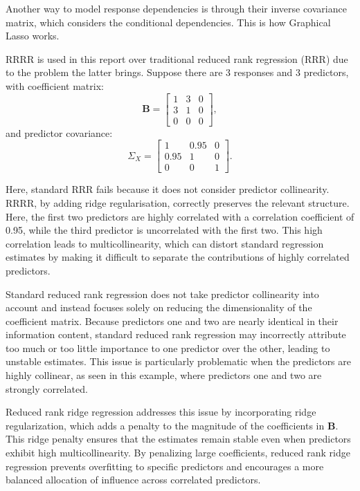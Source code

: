 Another way to model response dependencies is through their inverse covariance matrix, which considers the conditional dependencies. This is how Graphical Lasso works.



RRRR is used in this report over traditional reduced rank regression (RRR) due to the problem the latter brings. Suppose there are 3 responses and 3 predictors, with coefficient matrix:
\[
\mathbf{B} = \begin{bmatrix} 1 & 3 & 0 \\ 3 & 1 & 0 \\ 0 & 0 & 0 \end{bmatrix},
\]
and predictor covariance:
\[
{\Sigma}_X = \begin{bmatrix} 1 & 0.95 & 0 \\ 0.95 & 1 & 0 \\ 0 & 0 & 1 \end{bmatrix}.
\]

\noindent Here, standard RRR fails because it does not consider predictor collinearity. RRRR, by adding ridge regularisation, correctly preserves the relevant structure.\cite{mukherjee2011reduced} Here, the first two predictors are highly correlated with a correlation coefficient of 0.95, while the third predictor is uncorrelated with the first two. This high correlation leads to multicollinearity, which can distort standard regression estimates by making it difficult to separate the contributions of highly correlated predictors.  

Standard reduced rank regression does not take predictor collinearity into account and instead focuses solely on reducing the dimensionality of the coefficient matrix. Because predictors one and two are nearly identical in their information content, standard reduced rank regression may incorrectly attribute too much or too little importance to one predictor over the other, leading to unstable estimates. This issue is particularly problematic when the predictors are highly collinear, as seen in this example, where predictors one and two are strongly correlated.  

Reduced rank ridge regression addresses this issue by incorporating ridge regularization, which adds a penalty to the magnitude of the coefficients in \( \mathbf{B} \). This ridge penalty ensures that the estimates remain stable even when predictors exhibit high multicollinearity. By penalizing large coefficients, reduced rank ridge regression prevents overfitting to specific predictors and encourages a more balanced allocation of influence across correlated predictors.  

